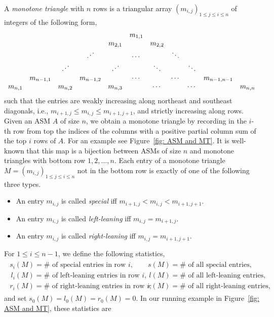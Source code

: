 A \emph{monotone triangle} with $n$ rows is a triangular array $(m_{i,j})_{1\leq j \leq i \leq n}$ of integers of the following form,
\[
\begin{array}{c c c c c c c c c c c}
&&&&& m_{1,1}\\
&&&& m_{2,1} && m_{2,2}\\
&&& \iddots && \cdots &&\ddots\\
&& \iddots && \iddots && \ddots &&\ddots\\
& m_{n-1,1} && m_{n-1,2} && \cdots  && \cdots  && m_{n-1,n-1}\\
m_{n,1} && m_{n,2} && m_{n,3} && \cdots  && \cdots && m_{n,n}
\end{array}
\]
such that the entries are weakly increasing along northeast and southeast diagonals, i.e., $m_{i+1,j}  \leq m_{i,j} \leq m_{i+1,j+1}$, and strictly increasing along rows. Given an ASM $A$ of size $n$, we obtain a monotone triangle by recording in the $i$-th row from top the indices of the columns with a positive partial column sum of the top $i$ rows of $A$. For an example see Figure~\ref{fig: ASM and MT}. It is well-known that this map is a bijection between ASMs of size $n$ and monotone triangles with bottom row $1,2,\ldots,n$.
Each entry of a monotone triangle $M=(m_{i,j})_{1 \leq j \leq i \leq n}$ not in the bottom row is exactly of one of the following three types.
\begin{itemize}
\item An entry $m_{i,j}$ is called \emph{special} iff $m_{i+1,j} < m_{i,j} < m_{i+1,j+1}$.
\item An entry $m_{i,j}$ is called \emph{left-leaning} iff $m_{i,j}= m_{i+1,j}$.
\item An entry $m_{i,j}$ is called \emph{right-leaning} iff $m_{i,j}= m_{i+1,j+1}$.
\end{itemize}
For $1 \leq i \leq n-1$, we define the following statistics,
\begin{align*}
\begin{array}{lccl}
s_i(M) = \# \text{ of special entries in row }i,   &&&s(M) = \# \text{ of all special entries},\\
\,l_i(M) = \# \text{ of left-leaning entries in row }i,  &&&\,l(M) = \# \text{ of all left-leaning entries},\\
r_i(M) = \# \text{ of right-leaning entries in row }i,   &&&r(M) = \# \text{ of all right-leaning entries},
\end{array}
\end{align*} 
and set $s_0(M)=l_0(M)=r_0(M)=0$. In our running example in Figure~\ref{fig: ASM and MT}, these statistics are
